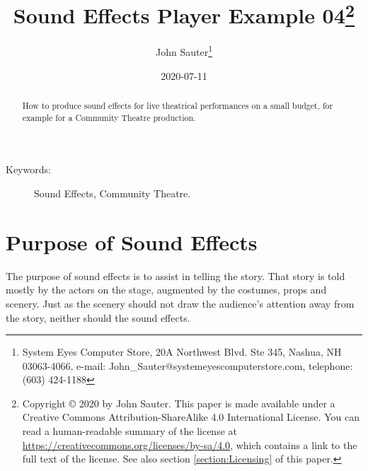 \documentclass[letterpaper,twoside]{article}
\begin{document}
\title{Sound Effects Player Example 04\footnote{Copyright
    {\copyright} 2020 by John Sauter.
    This paper is made available under a
    Creative Commons Attribution-ShareAlike 4.0 International License.
    You can read a human-readable summary of the license at
    \url{https://creativecommons.org/licenses/by-sa/4.0}, which contains
    a link to the full text of the license.
    See also section \ref{section:Licensing} of this paper.}
}
\author{John Sauter\footnote{
    System Eyes Computer Store,
    20A Northwest Blvd.  Ste 345,
    Nashua, NH  03063-4066,
    e-mail: John\_Sauter@systemeyescomputerstore.com,
    telephone: (603) 424-1188}}
\date{2020-07-11}
\maketitle
\begin{abstract}
  How to produce sound effects for live theatrical performances
  on a small budget,
  for example for a Community Theatre production.
\end{abstract}
\begin{description}
\item[Keywords:]Sound Effects, Community Theatre.
\end{description}
  
\newpage
\section{Purpose of Sound Effects}
The purpose of sound effects is to assist in telling the story.
That story is told mostly by the actors on the stage, augmented
by the costumes, props and scenery.  Just as the scenery should
not draw the audience's attention away from the story, neither
should the sound effects.
\end{document}
